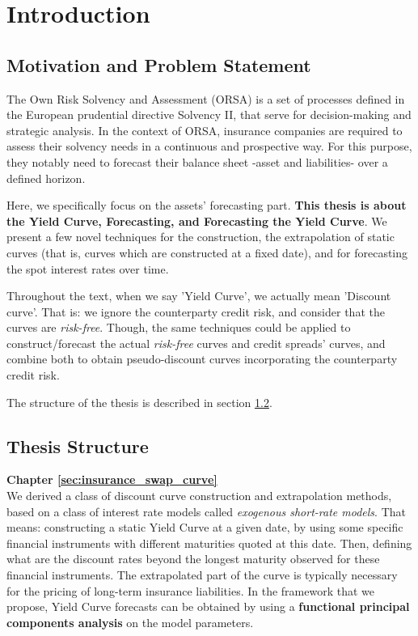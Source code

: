 %
\chapter{Introduction}
\label{sec:intro}

\section{Motivation and Problem Statement}
\label{sec:intro:motivation}

The Own Risk Solvency and Assessment (ORSA) is a set of processes defined in the European prudential directive Solvency II, that serve for decision-making and strategic analysis. In the context of ORSA, insurance companies are required to assess their solvency needs in a continuous and prospective way. For this purpose, they notably need to forecast their balance sheet -asset and liabilities- over a defined horizon. 

Here, we specifically focus on the assets' forecasting part. \textbf{This thesis is about the Yield Curve, Forecasting, and Forecasting the Yield Curve}. We present a few novel techniques for the construction, the extrapolation of static curves (that is, curves which are constructed at a fixed date), and for forecasting the spot interest rates over time. 

Throughout the text, when we say 'Yield Curve', we actually mean 'Discount curve'. That is: we ignore the counterparty credit risk, and consider that the curves are \textit{risk-free}. Though, the same techniques could be applied to construct/forecast the actual \textit{risk-free} curves and credit spreads' curves, and combine both to obtain pseudo-discount curves incorporating the counterparty credit risk. 

The structure of the thesis is described in section \ref{sec:intro:structure}. 

\section{Thesis Structure}
\label{sec:intro:structure}

\textbf{Chapter \ref{sec:insurance_swap_curve}} \\[0.2em]
We derived a class of discount curve construction and extrapolation methods,  based on a class of interest rate models called \textit{exogenous short-rate models}. That means: constructing a static Yield Curve at a given date, by using some specific financial instruments with different maturities quoted at this date. Then, defining what are the discount rates beyond the longest maturity observed for these financial instruments. The extrapolated part of the curve is typically necessary for the pricing of long-term insurance liabilities. In the framework that we propose, Yield Curve forecasts can be obtained by using a \textbf{functional principal components analysis} on the model parameters.

